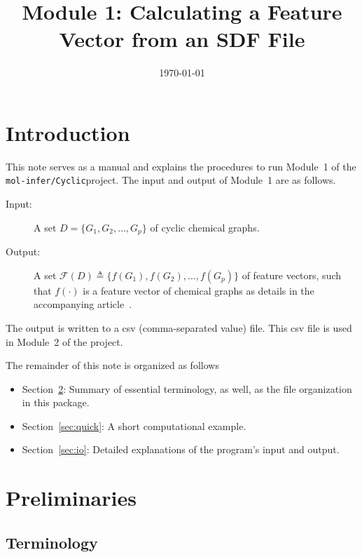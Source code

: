\documentclass[11pt, titlepage, dvipdfmx, twoside]{article}
\title{\huge Module 1: Calculating a Feature Vector from an SDF File}
\author{\project}
\newcommand{\project}{{\tt mol-infer/Cyclic}}
\newcommand{\secref}[1]{Section~\ref{sec:#1}}
\begin{document}
\makeatletter 
\let\c@lstlisting\c@figure
\makeatother
\date{\today}
\maketitle
\thispagestyle{empty}
\tableofcontents
\clearpage
{}


\section{Introduction}
This note serves as a manual and
explains the procedures to run Module~1 of the \project project.
The input and output of Module~1 are as follows.

\begin{oframed}
\begin{description}
\item[Input:] 
A set $D=\{G_1, G_2, \dots, G_p\}$ of cyclic chemical graphs. 
%
\item[Output:] 
A set ${\mathcal F}(D)\triangleq\{f(G_1), f(G_2), \dots, f(G_p)\}$
of feature vectors, such that $f(\cdot)$ is a feature vector of
chemical graphs as details in the accompanying article~\cite{BH_cyclic_arxiv}.
%
\end{description}
\end{oframed}
%
The output is written to a csv (comma-separated value) file.
This csv file is used in Module~2 of the project.


The remainder of this note is organized as follows
\begin{itemize}
\item \secref{preparation}: 
Summary of essential terminology, as well, as the file organization
in this package.

\item \secref{quick}: 
A short computational example.

\item \secref{io}: 
Detailed explanations of the program's input and output.
\end{itemize}

\clearpage
\section{Preliminaries}
\label{sec:preparation}

\subsection{Terminology}
\end{document}
